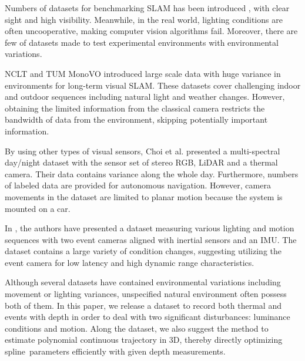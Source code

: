 Numbers of datasets for benchmarking \ac{SLAM} has been introduced
\cite{Cordts2016Cityscapes}, \cite{jjeong-2019-ijrr} with
clear sight and high visibility. Meanwhile, in the real world, lighting
conditions are often uncooperative, making computer vision algorithms fail.
Moreover, there are few of datasets made to test experimental
environments with environmental variations.

NCLT \cite{ncarlevaris-2015a} and TUM MonoVO \cite{engel2016photometrically}
introduced large scale data with huge variance in environments for long-term visual
\ac{SLAM}. These datasets cover challenging indoor and outdoor sequences including
natural light and weather changes. However, obtaining the limited information from the
classical camera restricts the bandwidth of data from the environment, skipping
potentially important information.

By using other types of visual sensors, Choi et al. \cite{8293689} presented
a multi-spectral day/night dataset with the sensor set of stereo RGB, LiDAR and
a thermal camera. Their data contains variance along the whole day. Furthermore,
numbers of labeled data are provided for autonomous navigation.
However, camera movements in the dataset are limited to planar motion because the
system is mounted on a car.

In \cite{zhu2018multivehicle}, the authors have presented a dataset measuring
various lighting and motion sequences with two event cameras aligned with
inertial sensors and an \ac{IMU}. The dataset contains a large variety of
condition changes, suggesting utilizing the event camera for low latency and high
dynamic range characteristics.

Although several datasets have contained environmental variations
including movement or lighting variances, unspecified natural environment often
possess both of them. In this paper, we release a dataset to record both thermal
and events with depth in order to deal with two significant disturbances:
luminance conditions and motion. Along the dataset, we also suggest the method to
estimate polynomial continuous trajectory in 3D, thereby directly optimizing spline\
parameters efficiently with given depth measurements.

